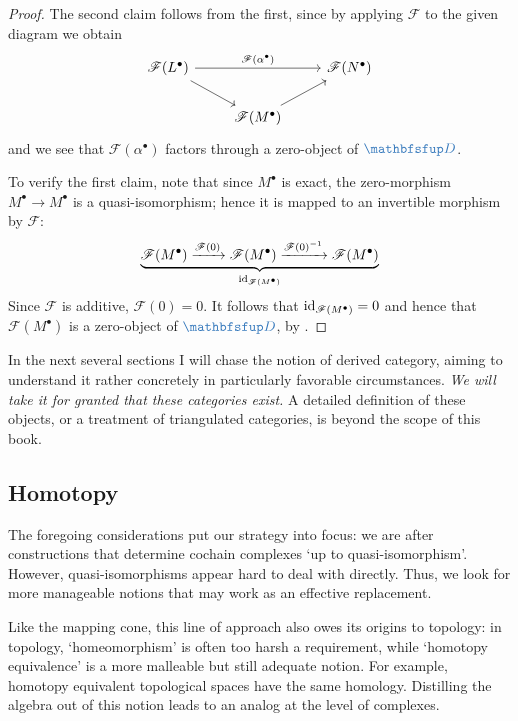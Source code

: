 \begin{proof}
  The second claim follows from the first, since by applying
  $\mathscr{F}$ to the given diagram we obtain
  \[\begin{tikzcd}
      \mathscr{F}(L^\bullet) \arrow[rr, "\mathscr{F}(\alpha^\bullet)"]
      \arrow[dr] & & \mathscr{F}(N^\bullet) \\
      & \mathscr{F}(M^\bullet) \arrow[ur]
    \end{tikzcd}\] and we see that $\mathscr{F}(\alpha^\bullet)$
  factors through a zero-object of $\categ{D}$.

  To verify the first claim, note that since $M^\bullet$ is exact, the
  zero-morphism $M^\bullet \to M^\bullet$ is a quasi-isomorphism;
  hence it is mapped to an invertible morphism by $\mathscr{F}$:
  \[
    \underbrace{\mathscr{F}(M^\bullet) \xrightarrow{\mathscr{F}(0)}
      \mathscr{F}(M^\bullet) \xrightarrow{\mathscr{F}(0)^{-1}}
      \mathscr{F}(M^\bullet)}_{\operatorname{id}_{\mathscr{F}(M^\bullet)}}
  \]
  Since $\mathscr{F}$ is additive, $\mathscr{F}(0) = 0$. It follows
  that $\operatorname{id}_{\mathscr{F}(M^\bullet)} = 0$ and hence that
  $\mathscr{F}(M^\bullet)$ is a zero-object of $\categ{D}$, by
  .
\end{proof}

In the next several sections I will chase the notion of derived
category, aiming to understand it rather concretely in particularly
favorable circumstances. \emph{We will take it for granted that these
  categories exist.} A detailed definition of these objects, or a
treatment of triangulated categories, is beyond the scope of this
book.

\subsection{Homotopy}
\label{subsec:homol:homotopy}

The foregoing considerations put our strategy into focus: we are after
constructions that determine cochain complexes `up to
quasi-isomorphism'. However, quasi-isomorphisms appear hard to deal
with directly. Thus, we look for more manageable notions that may work
as an effective replacement.

Like the mapping cone, this line of approach also owes its origins to
topology: in topology, `homeomorphism' is often too harsh a
requirement, while `homotopy equivalence' is a more malleable but
still adequate notion. For example, homotopy equivalent topological
spaces have the same homology. Distilling the algebra out of this
notion leads to an analog at the level of complexes.

